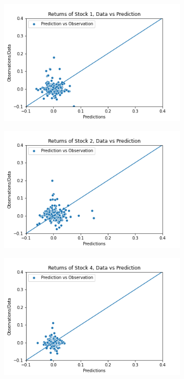 \begin{figure}[t]%
	\centering
	\begin{subfigure}[l]{0.3\textwidth}
		\includegraphics[width=\textwidth]{img/07_3/Q1_kernel1_stock1_scatter.png}
	\end{subfigure}
	\begin{subfigure}[c]{0.3\textwidth}
		\includegraphics[width=\textwidth]{img/07_3/Q1_kernel1_stock2_scatter.png}
	\end{subfigure}
	\begin{subfigure}[r]{0.3\textwidth}
		\includegraphics[width=\textwidth]{img/07_3/Q2_kernel1_stock4_scatter.png}

\end{subfigure}
\end{figure}
